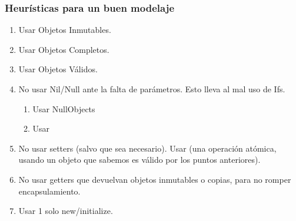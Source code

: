 \subsubsection{Heur\'isticas para un buen modelaje}

\begin{enumerate}
 \itemsep-0.3em 
 \item Usar Objetos Inmutables.
 \item Usar Objetos Completos. 
 \item Usar Objetos V\'alidos. 
 \item No usar Nil/Null ante la falta de par\'ametros. Esto lleva al mal uso de Ifs.
 \begin{enumerate}
  \itemsep-0.3em 
  \item Usar NullObjects
  \item Usar 
 \end{enumerate}
 \item No usar setters (salvo que sea necesario). Usar  (una operaci\'on at\'omica, usando un objeto que sabemos es v\'alido por los puntos anteriores). 
 \item No usar getters que devuelvan objetos inmutables o copias, para no romper encapsulamiento. 
 \item Usar 1 solo new/initialize. 
\end{enumerate}

